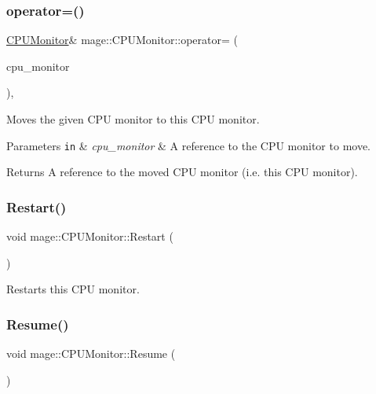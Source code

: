 \subsubsection{\texorpdfstring{operator=()}{operator=()}\hspace{0.1cm}{\footnotesize\ttfamily [2/2]}}
{\footnotesize\ttfamily \hyperlink{classmage_1_1_c_p_u_monitor}{C\+P\+U\+Monitor}\& mage\+::\+C\+P\+U\+Monitor\+::operator= (\begin{DoxyParamCaption}\item[{\hyperlink{classmage_1_1_c_p_u_monitor}{C\+P\+U\+Monitor} \&\&}]{cpu\+\_\+monitor }\end{DoxyParamCaption})\hspace{0.3cm}{\ttfamily [default]}, {\ttfamily [noexcept]}}

Moves the given C\+PU monitor to this C\+PU monitor.


\begin{DoxyParams}[1]{Parameters}
\mbox{\tt in}  & {\em cpu\+\_\+monitor} & A reference to the C\+PU monitor to move. \\
\hline
\end{DoxyParams}
\begin{DoxyReturn}{Returns}
A reference to the moved C\+PU monitor (i.\+e. this C\+PU monitor). 
\end{DoxyReturn}
\hypertarget{classmage_1_1_c_p_u_monitor_ab8b04a64545df631be0f40a54cc49e03}{}\label{classmage_1_1_c_p_u_monitor_ab8b04a64545df631be0f40a54cc49e03} 
\subsubsection{\texorpdfstring{Restart()}{Restart()}}
{\footnotesize\ttfamily void mage\+::\+C\+P\+U\+Monitor\+::\+Restart (\begin{DoxyParamCaption}{ }\end{DoxyParamCaption})\hspace{0.3cm}{\ttfamily [noexcept]}}

Restarts this C\+PU monitor. \hypertarget{classmage_1_1_c_p_u_monitor_a5fd594262dc1073da564955c58851760}{}\label{classmage_1_1_c_p_u_monitor_a5fd594262dc1073da564955c58851760} 
\subsubsection{\texorpdfstring{Resume()}{Resume()}}
{\footnotesize\ttfamily void mage\+::\+C\+P\+U\+Monitor\+::\+Resume (\begin{DoxyParamCaption}{ }\end{DoxyParamCaption})\hspace{0.3cm}{\ttfamily [noexcept]}}

